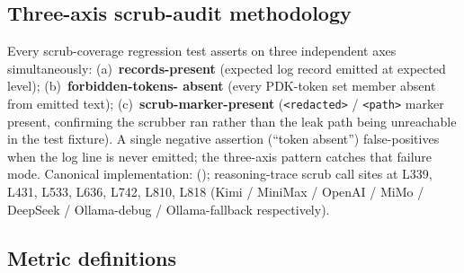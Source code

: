 \subsection{Three-axis scrub-audit methodology}
\label{sec:method-audit}

Every scrub-coverage regression test asserts on three independent
axes simultaneously: (a)~\textbf{records-present} (expected log
record emitted at expected level); (b)~\textbf{forbidden-tokens-%
absent} (every PDK-token set member absent from emitted text);
(c)~\textbf{scrub-marker-present}
(\texttt{<redacted>} / \texttt{<path>} marker present, confirming
the scrubber ran rather than the leak path being unreachable in
the test fixture). A single negative assertion (``token absent'')
false-positives when the log line is never emitted; the three-axis
pattern catches that failure mode. Canonical implementation:
(); reasoning-trace
scrub call sites at 
L339, L431, L533, L636, L742, L810, L818
(Kimi / MiniMax / OpenAI / MiMo / DeepSeek / Ollama-debug /
Ollama-fallback respectively).

\subsection{Metric definitions}
\label{sec:method-metrics}

